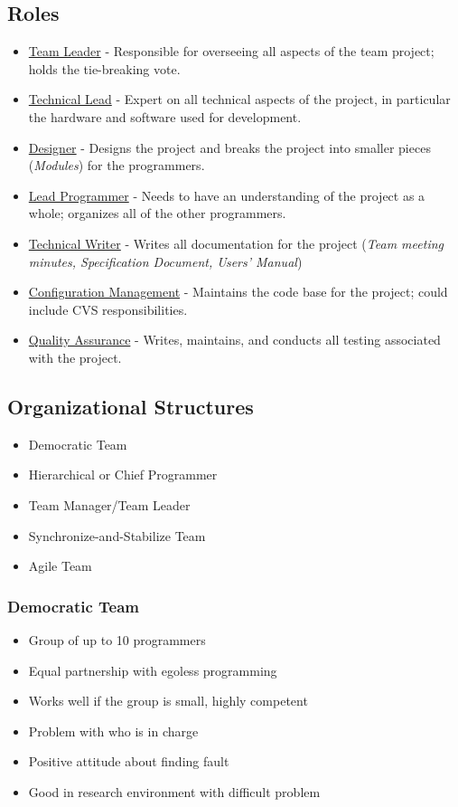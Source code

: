 \documentclass{report}
\begin{document}
			\subsection{Roles}
				\begin{itemize}
					\item \underline{Team Leader} - Responsible for overseeing all aspects of the team project; holds the tie-breaking vote.
					\item \underline{Technical Lead} - Expert on all technical aspects of the project, in particular the hardware and software used for development.
					\item \underline{Designer} - Designs the project and breaks the project into smaller pieces (\textit{Modules}) for the programmers.
					\item \underline{Lead Programmer} - Needs to have an understanding of the project as a whole; organizes all of the other programmers.
					\item \underline{Technical Writer} - Writes all documentation for the project (\textit{Team meeting minutes, Specification Document, Users' Manual})
					\item \underline{Configuration Management} - Maintains the code base for the project; could include CVS responsibilities.
					\item \underline{Quality Assurance} - Writes, maintains, and conducts all testing associated with the project.
				\end{itemize}
			\subsection{Organizational Structures}
				\begin{itemize}
					\item Democratic Team
					\item Hierarchical or Chief Programmer
					\item Team Manager/Team Leader
					\item Synchronize-and-Stabilize Team
					\item Agile Team
				\end{itemize}
				\subsubsection{Democratic Team}
					\begin{itemize}
						\item Group of up to 10 programmers
						\item Equal partnership with egoless programming
						\item Works well if the group is small, highly competent
						\item Problem with who is in charge
						\item Positive attitude about finding fault
						\item Good in research environment with difficult problem
					\end{itemize}
\end{document}
